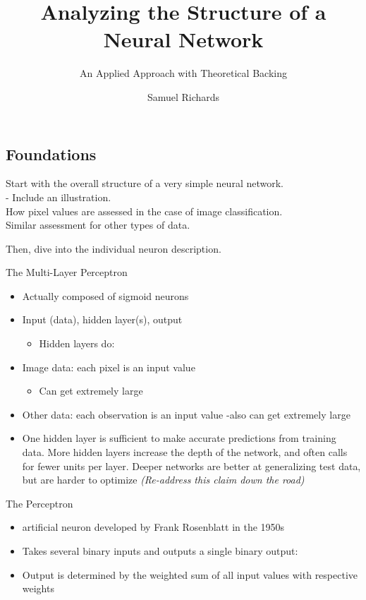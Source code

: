 \documentclass[
]{article}
\title{Analyzing the Structure of a Neural Network}
\subtitle{An Applied Approach with Theoretical Backing}
\author{Samuel Richards}
\date{}
\providecommand{\tightlist}{%
  \setlength{\itemsep}{0pt}\setlength{\parskip}{0pt}}
\begin{document}
\maketitle

\hypertarget{foundations}{%
\subsection{Foundations}\label{foundations}}

Start with the overall structure of a very simple neural network.\\
- Include an illustration.\\
How pixel values are assessed in the case of image classification.\\
Similar assessment for other types of data.

Then, dive into the individual neuron description.

The Multi-Layer Perceptron

\begin{itemize}
\tightlist
\item
  Actually composed of sigmoid neurons
\item
  Input (data), hidden layer(s), output

  \begin{itemize}
  \tightlist
  \item
    Hidden layers do:
  \end{itemize}
\item
  Image data: each pixel is an input value

  \begin{itemize}
  \tightlist
  \item
    Can get extremely large
  \end{itemize}
\item
  Other data: each observation is an input value -also can get extremely
  large
\item
  One hidden layer is sufficient to make accurate predictions from
  training data. More hidden layers increase the depth of the network,
  and often calls for fewer units per layer. Deeper networks are better
  at generalizing test data, but are harder to optimize
  \cite{Goodfellow-et-al-2016} \emph{(Re-address this claim down the
  road)}
\end{itemize}

The Perceptron

\begin{itemize}
\tightlist
\item
  artificial neuron developed by Frank Rosenblatt in the 1950s
  \cite{nielsen}
\item
  Takes several binary inputs and outputs a single binary output:
\item
  Output is determined by the weighted sum of all input values with
  respective weights
\end{itemize}
\end{document}
